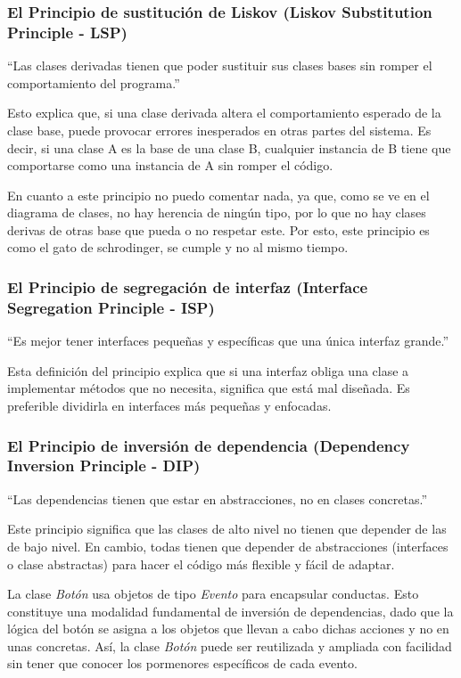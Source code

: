 \subsubsection{El Principio de sustitución de Liskov (Liskov Substitution Principle - LSP)}

``Las clases derivadas tienen que poder sustituir sus clases bases sin romper el comportamiento del programa.''

Esto explica que, si una clase derivada altera el comportamiento esperado de la clase base, puede provocar errores inesperados en otras partes del sistema. Es decir, si una clase A es la base de una clase B, cualquier instancia de B tiene que comportarse como una instancia de A sin romper el código.

En cuanto a este principio no puedo comentar nada, ya que, como se ve en el diagrama de clases, no hay herencia de ningún tipo, por lo que no hay clases derivas de otras base que pueda o no respetar este. Por esto, este principio es como el gato de schrodinger, se cumple y no al mismo tiempo.

\subsubsection{El Principio de segregación de interfaz (Interface Segregation Principle - ISP)}

``Es mejor tener interfaces pequeñas y específicas que una única interfaz grande.'' 

Esta definición del principio explica que si una interfaz obliga una clase a implementar métodos que no necesita, significa que está mal diseñada. Es preferible dividirla en interfaces más pequeñas y enfocadas.

\subsubsection{El Principio de inversión de dependencia (Dependency Inversion Principle - DIP)}

``Las dependencias tienen que estar en abstracciones, no en clases concretas.''

Este principio significa que las clases de alto nivel no tienen que depender de las de bajo nivel. En cambio, todas tienen que depender de abstracciones (interfaces o clase abstractas) para hacer el código más flexible y fácil de adaptar.

La clase \textit{Botón} usa objetos de tipo \textit{Evento} para encapsular conductas. Esto constituye una modalidad fundamental de inversión de dependencias, dado que la lógica del botón se asigna a los objetos que llevan a cabo dichas acciones y no en unas concretas. Así, la clase \textit{Botón} puede ser reutilizada y ampliada con facilidad sin tener que conocer los pormenores específicos de cada evento.


